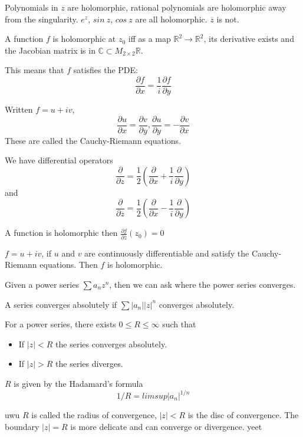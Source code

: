 \documentclass[main.tex]{subfiles}
\begin{document}
\begin{example} 
Polynomials in $z$ are holomorphic, rational polynomials are holomorphic away from the singularity. $e^z$, $sin \ z$, $cos \ z$ are all holomorphic. $\overline{z}$ is not. 
\end{example}

A function $f$ is holomorphic at $z_0$ iff as a map $\mathbb{R}^2 \rightarrow \mathbb{R}^2$, its derivative exists and the Jacobian matrix is in $\mathbb{C} \subset M_{2 \times 2}\mathbb{R}$.

This means that $f$ satisfies the PDE:
$$
\frac{\partial f}{\partial x} = \frac{1}{i} \frac{\partial f}{\partial y}
$$

Written $f = u + iv$, 
$$
\frac{\partial u}{\partial x} = \frac{\partial v}{\partial y}, \frac{\partial u}{\partial y} = -\frac{\partial v}{\partial x}
$$
These are called the Cauchy-Riemann equations.

We have differential operators
$$
\frac{\partial}{\partial z} = \frac{1}{2} (\frac{\partial}{\partial x} + \frac{1}{i}\frac{\partial}{\partial y})
$$
and 
$$
\frac{\partial}{\partial \overline{z}} = \frac{1}{2} (\frac{\partial}{\partial x} - \frac{1}{i}\frac{\partial}{\partial y})
$$

A function is holomorphic then $\frac{\partial f}{\partial \overline{z}}(z_0) = 0$

\begin{theorem}
$f = u + iv$, if $u$ and $v$ are continuously differentiable and satisfy the Cauchy-Riemann equations. Then $f$ is holomorphic.
\end{theorem}

Given a power series $\sum a_n z^n$, then we can ask where the power series converges.

A series converges absolutely if $\sum|a_n||z|^n $ converges absolutely.

\begin{theorem}
For a power series, there exists $0 \leq R \leq \infty$ such that 
\begin{itemize}
    \item If $|z| < R$ the series converges absolutely.
    \item If $|z| > R$ the series diverges.
\end{itemize}
$R$ is given by the Hadamard's formula 
$$
1/R = lim sup |a_n|^{1/n}
$$
\end{theorem}
uwu
$R$ is called the radius of convergence, $|z| < R$ is the disc of convergence. The boundary $|z| = R$ is more delicate and can converge or divergence. yeet
\end{document}
